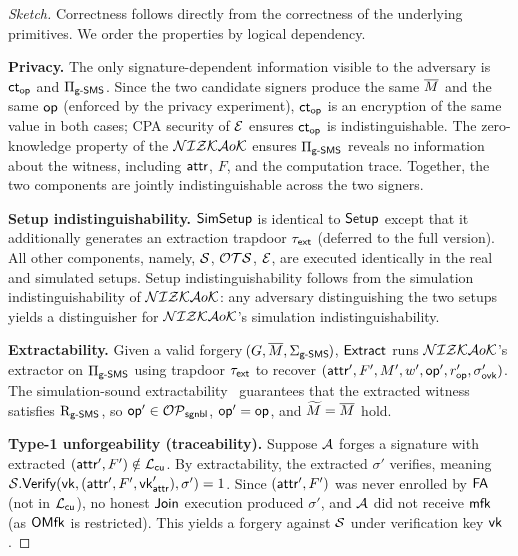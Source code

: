 \begin{proof}[Sketch]
Correctness follows directly from the correctness of the underlying primitives.
We order the properties by logical dependency.

\medskip
\noindent\textbf{Privacy.}
The only signature-dependent information visible to the adversary is
$\mathsf{ct}_\mathsf{op}$ and $\Pi_{\mathsf{g}\textsf{-}\mathsf{SMS}}$.
Since the two candidate signers produce the same $\overline{M}$ and the same $\mathsf{op}$
(enforced by the privacy experiment),
$\mathsf{ct}_\mathsf{op}$ is an encryption of the same value in both cases;
CPA security of $\mathcal{E}$ ensures $\mathsf{ct}_\mathsf{op}$ is indistinguishable.
The zero-knowledge property of the $\mathcal{NIZKA}o\mathcal{K}$ ensures $\Pi_{\mathsf{g}\textsf{-}\mathsf{SMS}}$
reveals no information about the witness,
including $\mathsf{attr}$, $F$, and the computation trace.
Together, the two components are jointly indistinguishable across the two signers.

\medskip
\noindent\textbf{Setup indistinguishability.}
$\mathsf{SimSetup}$ is identical to $\mathsf{Setup}$ except that it additionally generates
an extraction trapdoor $\tau_\mathsf{ext}$ (deferred to the full version).
All other components, namely, $\mathcal{S}$, $\mathcal{OTS}$, $\mathcal{E}$,
are executed identically in the real and simulated setups.
Setup indistinguishability follows from the simulation indistinguishability
of $\mathcal{NIZKA}o\mathcal{K}$: any adversary distinguishing the two setups yields
a distinguisher for $\mathcal{NIZKA}o\mathcal{K}$'s simulation indistinguishability.

\medskip
\noindent\textbf{Extractability.}\hspace{-0.7pt}
Given a valid forgery $\!(G, \overline{M}, \Sigma_{\mathsf{g}\textsf{-}\mathsf{SMS}}\hspace{-0.7pt})$,
$\mathsf{Extract}$ runs $\mathcal{NIZKA}o\mathcal{K}$'s extractor on $\Pi_{\mathsf{g}\textsf{-}\mathsf{SMS}}$
using trapdoor $\tau_\mathsf{ext}$ to recover $(\mathsf{attr}', F', M', w', \mathsf{op}', r_\mathsf{op}', \sigma_{\mathsf{ovk}}')$.
The simulation-sound extractability~\cite{CRYPTO:ChaLys06}
guarantees that the extracted witness satisfies $\mathrm{R}_{\mathsf{g}\textsf{-}\mathsf{SMS}}$,
so $\mathsf{op}' \in \mathcal{OP}_\mathsf{sgnbl}$, $\mathsf{op}' = \mathsf{op}$, and $\widetilde{M} = \overline{M}$ hold.

\medskip
\noindent\textbf{Type-1 unforgeability (traceability).}
Suppose $\mathcal{A}$ forges a signature with extracted $(\mathsf{attr}', F') \notin \mathcal{L}_\mathsf{cu}$.
By extractability, the extracted $\sigma'$ verifies, meaning
$\mathcal{S}.\mathsf{Verify}(\mathsf{vk}, (\mathsf{attr}', F', \mathsf{vk}_\mathsf{attr}'), \sigma') = 1$.
Since $(\mathsf{attr}', F')$ was never enrolled by $\mathsf{FA}$ (not in $\mathcal{L}_\mathsf{cu}$),
no honest $\mathsf{Join}$ execution produced $\sigma'$,
and $\mathcal{A}$ did not receive $\mathsf{mfk}$ (as $\mathsf{OMfk}$ is restricted).
This yields a forgery against $\mathcal{S}$ under verification key $\mathsf{vk}$.


\end{proof}
